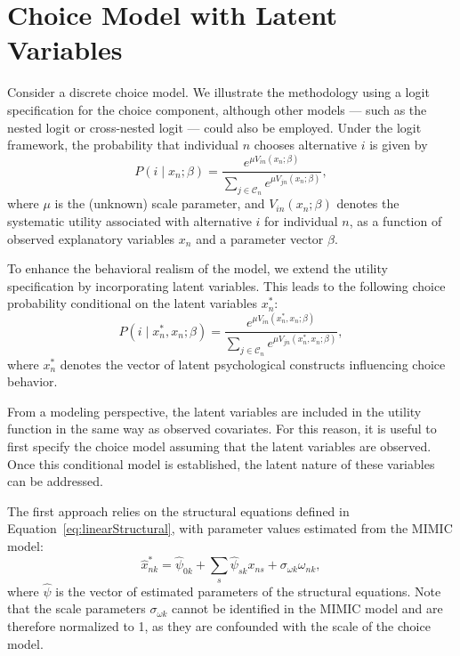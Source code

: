 \documentclass[12pt,a4paper]{article}
\begin{document}
\section{Choice Model with Latent Variables}

Consider a discrete choice model. We illustrate the methodology using a logit specification for the choice component, although other models --- such as the nested logit or cross-nested logit --- could also be employed. Under the logit framework, the probability that individual \( n \) chooses alternative \( i \) is given by
\begin{equation}
  \label{eq:logit}
  P(i \mid x_n; \beta) = \frac{e^{\mu V_{in}(x_n; \beta)}}{\sum_{j \in \mathcal{C}_n} e^{\mu V_{jn}(x_n; \beta)}},
\end{equation}
where \( \mu \) is the (unknown) scale parameter, and \( V_{in}(x_n; \beta) \) denotes the systematic utility associated with alternative \( i \) for individual \( n \), as a function of observed explanatory variables \( x_n \) and a parameter vector \( \beta \).

To enhance the behavioral realism of the model, we extend the utility specification by incorporating latent variables. This leads to the following choice probability conditional on the latent variables \( x_n^* \):
\begin{equation}
  \label{eq:choice_latent}
  P(i \mid x_n^*, x_n; \beta) = \frac{e^{\mu V_{in}(x_n^*, x_n; \beta)}}{\sum_{j \in \mathcal{C}_n} e^{\mu V_{jn}(x_n^*, x_n; \beta)}},
\end{equation}
where \( x_n^* \) denotes the vector of latent psychological constructs influencing choice behavior.

From a modeling perspective, the latent variables are included in the utility function in the same way as observed covariates. For this reason, it is useful to first specify the choice model assuming that the latent variables are observed. Once this conditional model is established, the latent nature of these variables can be addressed.

The first approach relies on the structural equations defined in Equation~\eqref{eq:linearStructural}, with parameter values estimated from the MIMIC model:
\begin{equation}
 \widehat{x}_{nk}^* = \widehat{\psi}_{0k} + \sum_s \widehat{\psi}_{sk} x_{ns} + \sigma_{\omega k} \omega_{nk},
\end{equation}
where \( \widehat{\psi} \) is the vector of estimated parameters of the structural equations. Note that the scale parameters \( \sigma_{\omega k} \) cannot be identified in the MIMIC model and are therefore normalized to 1, as they are confounded with the scale of the choice model.
\end{document}
